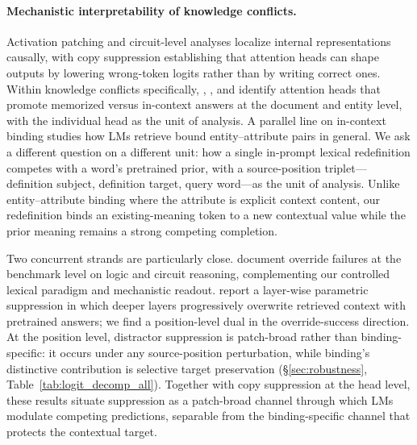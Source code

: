 \documentclass[11pt]{article}
\begin{document}
\paragraph{Mechanistic interpretability of knowledge conflicts.}
Activation patching \citep{vig2020causal, meng2022rome, zhang2024towards} and circuit-level
analyses \citep{wang2023ioi, olsson2022induction, mcdougall2024copy} localize internal
representations causally, with copy suppression \citep{mcdougall2024copy} establishing that
attention heads can shape outputs by lowering wrong-token logits rather than by writing
correct ones. Within knowledge conflicts specifically, \citet{yu2023characterizing},
\citet{ortu2024competition}, and \citet{jin2024cutting} identify attention heads that promote
memorized versus in-context answers at the document and entity level, with the individual
head as the unit of analysis. A parallel line on in-context binding
\citep{feng2024binding, prakash2024finetuning, gurarieh2025mixing} studies how LMs
retrieve bound entity--attribute pairs in general. We ask a different question on a different
unit: how a single in-prompt lexical redefinition competes with a word's pretrained prior,
with a source-position triplet---definition subject, definition target, query word---as the
unit of analysis. Unlike entity--attribute binding where the attribute is explicit context
content, our redefinition binds an existing-meaning token to a new contextual value while the
prior meaning remains a strong competing completion.

Two concurrent strands are particularly close. \citet{thota2026semantic} document
override failures at the benchmark level on logic and circuit reasoning, complementing our
controlled lexical paradigm and mechanistic readout. \citet{ma2026corect} report a layer-wise
parametric suppression in which deeper layers progressively overwrite retrieved context with
pretrained answers; we find a position-level dual in the override-success direction. At the
position level, distractor suppression is patch-broad rather than binding-specific: it
occurs under any source-position perturbation, while binding's distinctive contribution is
selective target preservation (\S\ref{sec:robustness},
Table~\ref{tab:logit_decomp_all}). Together with copy suppression at the head level, these
results situate suppression as a patch-broad channel through which LMs modulate competing
predictions, separable from the binding-specific channel that protects the contextual target.
\end{document}
